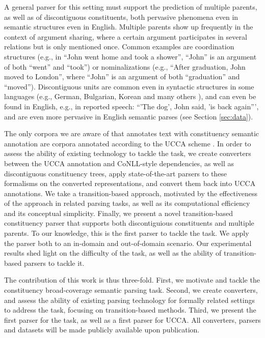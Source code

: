 \documentclass[11pt]{article}
\newcommand{\secref}[1]{Section \ref{#1}}
\begin{document}
A general parser for this setting must support the prediction of multiple parents,
as well as of discontiguous constituents, both pervasive phenomena even in semantic
structures even in English. Multiple parents show up frequently in the context of argument
sharing, where a certain argument participates in several relations but is only mentioned once.
Common examples are coordination structures
(e.g., in ``John went home and took a shower'', ``John'' is an argument of both ``went'' and ``took'')
or nominalizations (e.g., ``After graduation, John moved to London'', where ``John'' is an argument
of both ``graduation'' and ``moved'').
Discontiguous units are common even in syntactic structures in some languages (e.g., German, Bulgarian,
Korean and many others \cite{kallmeyer2013data}), and can even be found in English, e.g., in reported
speech: ``'The dog', John said, 'is back again''', and are even more pervasive in English semantic parses
(see \secref{sec:data}).

The only corpora we are aware of that annotates text with constituency semantic annotation are
corpora annotated according to the UCCA scheme \cite{abend2013universal,sulem2015conceptual}.
In order to assess the ability of existing technology to tackle the task,
we create converters between the UCCA annotation and CoNLL-style dependencies, as well as
discontiguous constituency trees, apply state-of-the-art parsers to these formalisms on
the converted representations, and convert them back into UCCA annotations.
We take a transition-based approach, motivated by the effectiveness of the approach in
related parsing tasks, as well as its computational efficiency and its conceptual simplicity.
Finally, we present a novel transition-based constituency parser that supports both discontiguious
constituents and multiple parents. To our knowledge, this is the first parser to tackle the task.
We apply the parser both to an in-domain and out-of-domain scenario.
Our experimental results shed light on the difficulty of the task, as well as the ability of
transition-based parsers to tackle it.

The contribution of this work is thus three-fold. First, we motivate and tackle the constituency broad-coverage
semantic parsing task. Second, we create converters, and assess the ability of existing parsing technology
for formally related settings to address the task, focusing on transition-based methods.
Third, we present the first parser for the task, as well as a first parser for UCCA.
All converters, parsers and datasets will be made publicly available upon publication.
\end{document}
